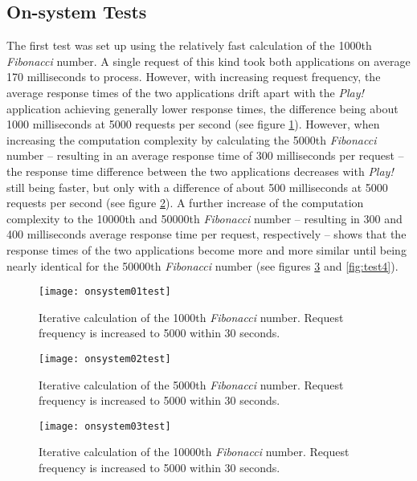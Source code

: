 \subsection*{On-system Tests}
The first test was set up using the relatively fast calculation of the 1000th \textit{Fibonacci} number. A single request of this kind took both applications on average 170 milliseconds to process. However, with increasing request frequency, the average response times of the two applications drift apart with the \textit{Play!} application achieving generally lower response times, the difference being about 1000 milliseconds at 5000 requests per second (see figure \ref{fig:test1}). However, when increasing the computation complexity by calculating the 5000th \textit{Fibonacci} number -- resulting in an average response time of 300 milliseconds per request -- the response time difference between the two applications decreases with \textit{Play!} still being faster, but only with a difference of about 500 milliseconds at 5000 requests per second (see figure \ref{fig:test2}). A further increase of the computation complexity to the 10000th and 50000th \textit{Fibonacci} number -- resulting in 300 and 400 milliseconds average response time per request, respectively -- shows that the response times of the two applications become more and more similar until being nearly identical for the 50000th \textit{Fibonacci} number (see figures \ref{fig:test3} and \ref{fig:test4}).

\begin{figure}
\centering\small
\setlength{\tabcolsep}{0mm}
  \texttt{[image: onsystem01test]}
\caption{Iterative calculation of the 1000th \textit{Fibonacci} number. Request frequency is increased to 5000 within 30 seconds.
}
\label{fig:test1} 
\end{figure}

\begin{figure}
\centering\small
\setlength{\tabcolsep}{0mm}
  \texttt{[image: onsystem02test]} 
\caption{Iterative calculation of the 5000th \textit{Fibonacci} number. Request frequency is increased to 5000 within 30 seconds.
}
\label{fig:test2} 
\end{figure}

\begin{figure}
\centering\small
\setlength{\tabcolsep}{0mm}
  \texttt{[image: onsystem03test]}
\caption{Iterative calculation of the 10000th \textit{Fibonacci} number. Request frequency is increased to 5000 within 30 seconds.
}
\label{fig:test3} 
\end{figure}

